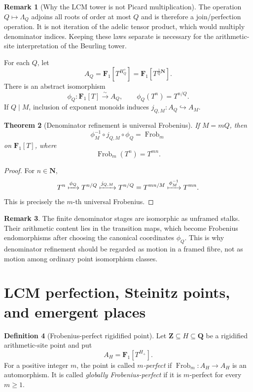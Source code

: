 \documentclass[11pt]{amsart}
\numberwithin{equation}{section}
\newtheorem{theorem}{Theorem}[section]
\theoremstyle{definition}
\newtheorem{definition}[theorem]{Definition}
\newtheorem{remark}[theorem]{Remark}
\newcommand{\Z}{\mathbf Z}
\newcommand{\Q}{\mathbf Q}
\newcommand{\N}{\mathbf N}
\newcommand{\Fone}{\mathbf F_1}
\newcommand{\Frob}{\operatorname{Frob}}
\begin{document}
\begin{remark}[Why the LCM tower is not Picard multiplication]
The operation $Q\mapsto\Lambda_Q$ adjoins all roots of order at most $Q$
and is therefore a join/perfection operation.  It is not iteration of the
adelic tensor product, which would multiply denominator indices.  Keeping
these laws separate is necessary for the arithmetic-site interpretation of
the Beurling tower.
\end{remark}

For each $Q$, let
\[
A_Q=\Fone[T^{H_Q^+}]
=\Fone[T^{\frac1Q\N}].
\]
There is an abstract isomorphism
\[
\phi_Q:\Fone[T]\xrightarrow{\sim}A_Q,
\qquad
\phi_Q(T^n)=T^{n/Q}.
\]
If $Q\mid M$, inclusion of exponent monoids induces
$j_{Q,M}:A_Q\hookrightarrow A_M$.

\begin{theorem}[Denominator refinement is universal Frobenius]
\label{thm:denominator-frobenius}
If $M=mQ$, then
\[
\boxed{
\phi_M^{-1}\circ j_{Q,M}\circ\phi_Q
=\operatorname{Frob}_m
}
\]
on $\Fone[T]$, where
\[
\operatorname{Frob}_m(T^n)=T^{mn}.
\]
\end{theorem}

\begin{proof}
For $n\in\N$,
\[
T^n\xmapsto{\phi_Q}T^{n/Q}
\xmapsto{j_{Q,M}}T^{n/Q}
=T^{mn/M}
\xmapsto{\phi_M^{-1}}T^{mn}.
\]
This is precisely the $m$-th universal Frobenius.
\end{proof}

\begin{remark}
The finite denominator stages are isomorphic as unframed stalks.  Their
arithmetic content lies in the transition maps, which become Frobenius
endomorphisms after choosing the canonical coordinates $\phi_Q$.  This is
why denominator refinement should be regarded as motion in a framed fibre,
not as motion among ordinary point isomorphism classes.
\end{remark}

\section{LCM perfection, Steinitz points, and emergent places}
\label{sec:lcm-perfection}

\begin{definition}[Frobenius-perfect rigidified point]
\label{def:frobenius-perfect-point}
Let $\Z\subseteq H\subseteq\Q$ be a rigidified arithmetic-site point and
put
\[
A_H=\Fone[T^{H_+}].
\]
For a positive integer $m$, the point is called \emph{$m$-perfect} if
$\Frob_m:A_H\to A_H$ is an automorphism.  It is called \emph{globally
Frobenius-perfect} if it is $m$-perfect for every $m\geq1$.
\end{definition}
\end{document}
